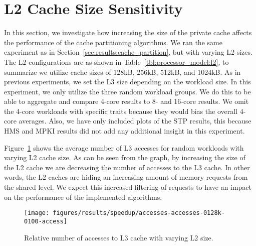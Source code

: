 \section{L2 Cache Size Sensitivity}
\label{sec:results:l2size_sensitivity}

In this section, we investigate how increasing the size of the private cache affects the performance of the cache partitioning algorithms.
We ran the same experiment as in Section~\ref{sec:results:cache_partition}, but with varying L2 sizes.
The L2 configurations are as shown in Table~\ref{tbl:processor_model:l2}, to summarize we utilize cache sizes of 128kB, 256kB, 512kB, and 1024kB.
As in previous experiments, we set the L3 size depending on the workload size.
In this experiment, we only utilize the three random workload groups.
We do this to be able to aggregate and compare 4-core results to 8- and 16-core results.
We omit the 4-core workloads with specific traits because they would bias the overall 4-core averages.
Also, we have only included plots of the STP results, this because HMS and MPKI results did not add any additional insight in this experiment.

Figure~\ref{fig:results:l2:access} shows the average number of L3 accesses for random workloads with varying L2 cache size.
As can be seen from the graph, by increasing the size of the L2 cache we are decreasing the number of accesses to the L3 cache.
In other words, the L2 caches are hiding an increasing amount of memory requests from the shared level.
We expect this increased filtering of requests to have an impact on the performance of the implemented algorithms.



\begin{figure}[th]
    \centering
    \texttt{[image: figures/results/speedup/accesses-accesses-0128k-0100-access]}
    \caption{Relative number of accesses to L3 cache with varying L2 size.}
    \label{fig:results:l2:access}
\end{figure}

